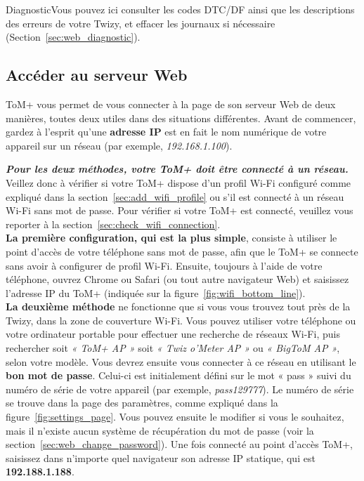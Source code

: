 {Diagnostic}{Vous pouvez ici consulter les codes DTC/DF ainsi que les descriptions des erreurs de votre Twizy, et effacer les journaux si nécessaire (Section~\ref{sec:web_diagnostic}).}


\subsection{Accéder au serveur Web}
\label{sec:web_server_access}

ToM+ vous permet de vous connecter à la page de son serveur Web de deux manières, toutes deux
utiles dans des situations différentes. Avant de commencer, gardez à l’esprit qu’une \textbf{adresse IP}
est en fait le nom numérique de votre appareil sur un réseau (par exemple, \textit{192.168.1.100}).

\textbf{\textit{Pour les deux méthodes, votre ToM+ doit être connecté à un réseau.}}
Veillez donc à vérifier si votre ToM+ dispose d’un profil Wi-Fi configuré comme
expliqué dans la section~\ref{sec:add_wifi_profile} ou s’il est connecté à un réseau Wi-Fi sans mot de passe.
Pour vérifier si votre ToM+ est connecté, veuillez vous reporter à la section~\ref{sec:check_wifi_connection}.\\

\textbf{La première configuration, qui est la plus simple}, consiste à utiliser le point d’accès de votre téléphone sans mot de passe, afin que le ToM+ se connecte
sans avoir à configurer de profil Wi-Fi. Ensuite, toujours à l’aide de votre téléphone, ouvrez Chrome ou
Safari (ou tout autre navigateur Web) et saisissez l’adresse IP du ToM+ (indiquée sur la figure~\ref{fig:wifi_bottom_line}).\\

\textbf{La deuxième méthode} ne fonctionne que si vous vous trouvez tout près de la Twizy, dans la zone de couverture Wi-Fi.
Vous pouvez utiliser votre téléphone ou votre ordinateur portable pour effectuer une recherche de réseaux Wi-Fi, puis rechercher soit
\textit{« ToM+ AP »} soit \textit{« Twiz o'Meter AP »} ou \textit{« BigToM AP »}, selon votre modèle. 
Vous devrez ensuite vous connecter à ce réseau en utilisant le \textbf{bon mot de passe}. Celui-ci est initialement 
défini sur le mot « pass » suivi du numéro de série de votre appareil (par exemple, \textit{pass129777}).
Le numéro de série se trouve dans la page des paramètres, comme expliqué dans la figure~\ref{fig:settings_page}. 
Vous pouvez ensuite le modifier si vous le souhaitez, mais il n’existe aucun système de récupération du mot de passe (voir la section~\ref{sec:web_change_password}).
Une fois connecté au point d’accès ToM+, saisissez dans n’importe quel navigateur son adresse IP statique, qui est \textbf{192.188.1.188}.


